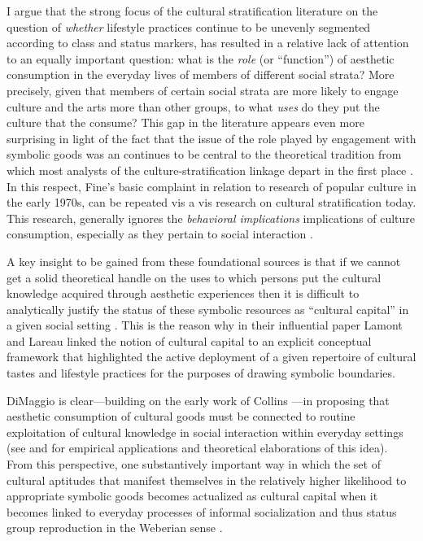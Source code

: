 \documentclass[11pt]{article}
\begin{document}
I argue that the strong focus of the cultural stratification literature on the question of \emph{whether} lifestyle practices continue to be unevenly segmented according to class and status markers, has resulted in a relative lack of attention to an equally important question:  what is the \emph{role} (or ``function'') of aesthetic consumption in the everyday lives of members of different social strata?  More precisely, given that members of certain social strata are more likely to engage culture and the arts more than other groups, to what \emph{uses} do they put the culture that the consume?  This gap in the literature appears even more surprising in light of the fact that the issue of the role played by engagement with symbolic goods was an continues to be central to the theoretical tradition from which most analysts of the culture-stratification linkage depart in the first place \citep{collins75, dimaggio87, douglas_isherwood96, fine77}.  In this respect, Fine's basic complaint in relation to research of popular culture in the early 1970s, can be repeated vis a vis research on cultural stratification today.  This research, generally ignores the \emph{behavioral implications} implications of culture consumption, especially as they pertain to social interaction \citep[453]{fine77}. 

A key insight to be gained from these foundational sources is that if we cannot get a solid theoretical handle on the uses to which persons put the cultural knowledge acquired through aesthetic experiences then it is difficult to analytically justify the status of these symbolic resources as ``cultural capital'' in a given social setting \citep{mohr_dimaggio95, dimaggio96, dimaggio00, carter03}.  This is the reason why in their influential paper Lamont and Lareau \citeyearpar{lamont_lareau88} linked the notion of cultural capital to an explicit conceptual framework that highlighted the active deployment of a given repertoire of cultural tastes and lifestyle practices for the purposes of drawing symbolic boundaries. 

DiMaggio \citeyearpar{dimaggio87, dimaggio00} is clear---building on the early work of Collins \citeyearpar{collins75}---in proposing that aesthetic consumption of cultural goods must be connected to routine exploitation of cultural knowledge in social interaction within everyday settings (see  \citet{erickson96} and \citet{lizardo06a} for empirical applications and theoretical elaborations of this idea).    From this perspective, one substantively important way in which the set of cultural aptitudes that manifest themselves in the relatively higher likelihood to appropriate symbolic goods becomes actualized as cultural capital when it becomes linked to everyday processes of informal socialization and thus status group reproduction in the Weberian sense \citep{dimaggio_mohr85, dimaggio96}.
\end{document}
